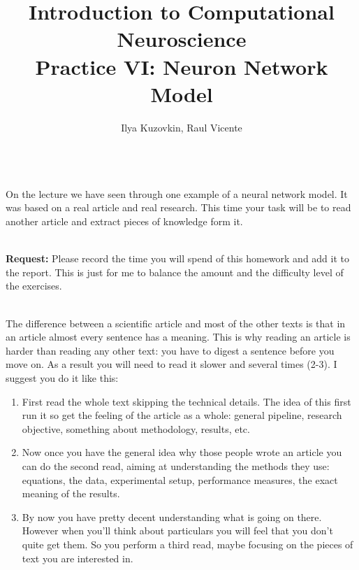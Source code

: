 \documentclass[a4paper,11pt]{article}
\author{\large{Ilya Kuzovkin, Raul Vicente}}
\title{\huge{Introduction to Computational Neuroscience}\\\LARGE{Practice VI: Neuron Network Model}}
\begin{document}
\maketitle


%
%
\ \\
On the lecture we have seen through one example of a neural network model. It was based on a real article and real research. This time your task will be to read another article and extract pieces of knowledge form it. 

\ \\
\textbf{Request:} Please record the time you will spend of this homework and add it to the report. This is just for me to balance the amount and the difficulty level of the exercises.

\ \\
The difference between a scientific article and most of the other texts is that in an article almost every sentence has a meaning. This is why reading an article is harder than reading any other text: you have to digest a sentence before you move on. As a result you will need to read it slower and several times (2-3). I suggest you do it like this:
\begin{enumerate}[label=\alph*)]
	\item First read the whole text skipping the technical details. The idea of this first run it so get the feeling of the article as a whole: general pipeline, research objective, something about methodology, results, etc.
	\item Now once you have the general idea why those people wrote an article you can do the second read, aiming at understanding the methods they use: equations, the data, experimental setup, performance measures, the exact meaning of the results.
	\item By now you have pretty decent understanding what is going on there. However when you'll think about particulars you will feel that you don't quite get them. So you perform a third read, maybe focusing on the pieces of text you are interested in.
\end{enumerate}
\end{document}
